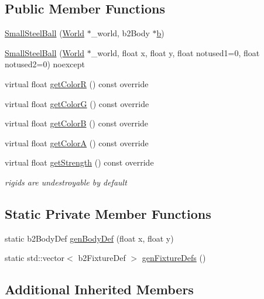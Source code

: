 \subsection*{Public Member Functions}
\begin{DoxyCompactItemize}
\item 
\hyperlink{classSmallSteelBall_a1ea5ad306a9f2f58c1258b04a2f54c3a}{Small\+Steel\+Ball} (\hyperlink{classWorld}{World} $\ast$\+\_\+world, b2\+Body $\ast$\hyperlink{image_8h_ab2d05693952610f937e5acb3c4a8fa1b}{b})
\item 
\hyperlink{classSmallSteelBall_a157358874deba10b80ba47dacdb53d8a}{Small\+Steel\+Ball} (\hyperlink{classWorld}{World} $\ast$\+\_\+world, float x, float y, float notused1=0, float notused2=0) noexcept
\item 
virtual float \hyperlink{classSmallSteelBall_aa15f3c1c1a2596edecb048b8a32f5d55}{get\+Color\+R} () const override
\item 
virtual float \hyperlink{classSmallSteelBall_a8d15df33cfeb00bd61060c7197250989}{get\+Color\+G} () const override
\item 
virtual float \hyperlink{classSmallSteelBall_a7ebf920ae4d29ca94edc7ad390031c37}{get\+Color\+B} () const override
\item 
virtual float \hyperlink{classSmallSteelBall_a2d11278708166ac6b05165baf86c1046}{get\+Color\+A} () const override
\item 
virtual float \hyperlink{classSmallSteelBall_a4831922627448be52f8b8a624ae8302f}{get\+Strength} () const override
\begin{DoxyCompactList}\small\item\em rigids are undestroyable by default \end{DoxyCompactList}\end{DoxyCompactItemize}
\subsection*{Static Private Member Functions}
\begin{DoxyCompactItemize}
\item 
static b2\+Body\+Def \hyperlink{classSmallSteelBall_a08631878447fc59f95145663bc614478}{gen\+Body\+Def} (float x, float y)
\item 
static std\+::vector$<$ b2\+Fixture\+Def $>$ \hyperlink{classSmallSteelBall_a46991848935388ea89d63730fb7d6592}{gen\+Fixture\+Defs} ()
\end{DoxyCompactItemize}
\subsection*{Additional Inherited Members}


